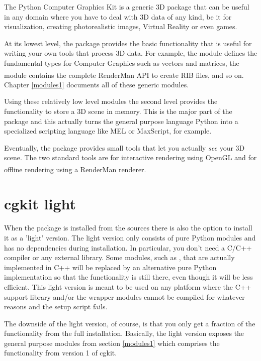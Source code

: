 
The Python Computer Graphics Kit is a generic 3D package that can be
useful in any domain where you have to deal with 3D data of any kind,
be it for visualization, creating photorealistic images, Virtual Reality
or even games.

At its lowest level, the package provides the basic functionality that is
useful for writing your own tools that process 3D data. For example, the 
 module defines the fundamental types for Computer Graphics
such as vectors and matrices, the  module contains the
complete RenderMan\textsuperscript{\textregistered} API to create RIB
files, and so on. Chapter \ref{modules1} documents all of these generic
modules.

Using these relatively low level modules the second level provides the
functionality to store a 3D scene in memory. This is the major part of
the package and this actually turns the general purpose language
Python into a specialized scripting language like MEL or MaxScript,
for example. 

Eventually, the package provides small tools that let you actually
{\em see} your 3D scene. The two standard tools are for interactive
rendering using OpenGL and for offline rendering using a 
RenderMan\textsuperscript{\textregistered} renderer.

\section{cgkit light}
\label{cgkitlight}

When the package is installed from the sources there is also the option
to install it as a 'light' version. The light version only consists of
pure Python modules and has no dependencies during installation. In
particular, you don't need a C/C++ compiler or any external library.
Some modules, such as , that are actually implemented in C++
will be replaced by an alternative pure Python implementation so that
the functionality is still there, even though it will be less efficient.
This light version is meant to be used on any platform where the C++
support library and/or the wrapper modules cannot be compiled for whatever 
reasons and the setup script fails.

The downside of the light version, of course, is that you only get a 
fraction of the functionality from the full installation. Basically,
the light version exposes the general purpose modules from section
\ref{modules1} which comprises the functionality from version 1 of cgkit.

